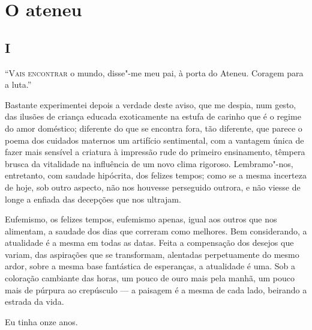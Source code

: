 

\chapter*{O ateneu}
\section{I}

\noindent\textsc{``Vais encontrar} o mundo, disse"-me meu pai, 
à porta do Ateneu. Coragem para a luta.'' 


Bastante experimentei depois a verdade deste aviso, que
me despia, num gesto, das ilusões de criança educada exoticamente na
estufa de carinho que é o regime do amor doméstico; diferente do que se
encontra fora, tão diferente, que parece o poema dos cuidados maternos
um artifício sentimental, com a vantagem única de fazer mais sensível a
criatura à impressão rude do primeiro ensinamento, têmpera brusca da
vitalidade na influência de um novo clima rigoroso. Lembramo"-nos,
entretanto, com saudade hipócrita, dos felizes tempos; como se a mesma
incerteza de hoje, sob outro aspecto, não nos houvesse perseguido
outrora, e não viesse de longe a enfiada das decepções que nos ultrajam. 

Eufemismo, os felizes tempos, eufemismo apenas, igual aos
outros que nos alimentam, a saudade dos dias que correram como
melhores. Bem considerando, a atualidade é a mesma em todas as datas.
Feita a compensação dos desejos que variam, das aspirações que se
transformam, alentadas perpetuamente do mesmo ardor, sobre a mesma base
fantástica de esperanças, a atualidade é uma. Sob a coloração cambiante
das horas, um pouco de ouro mais pela manhã, um pouco mais de púrpura
ao crepúsculo --- a paisagem é a mesma de cada lado, beirando a estrada
da vida. 

Eu tinha onze anos. 

